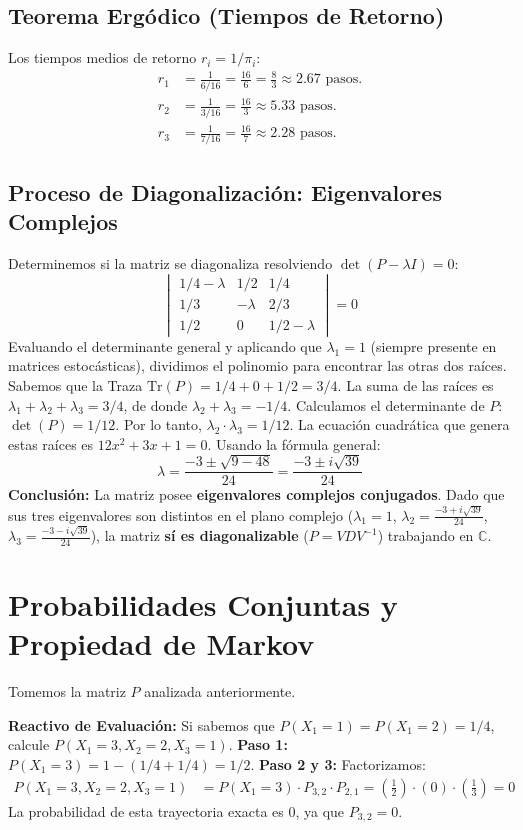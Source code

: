 \documentclass[12pt, a4paper]{article}
\begin{document}
\subsection{Teorema Ergódico (Tiempos de Retorno)}
Los tiempos medios de retorno $r_i = 1/\pi_i$:
\begin{align*}
    r_1 &= \frac{1}{6/16} = \frac{16}{6} = \frac{8}{3} \approx 2.67 \text{ pasos.} \\
    r_2 &= \frac{1}{3/16} = \frac{16}{3} \approx 5.33 \text{ pasos.} \\
    r_3 &= \frac{1}{7/16} = \frac{16}{7} \approx 2.28 \text{ pasos.}
\end{align*}

\subsection{Proceso de Diagonalización: Eigenvalores Complejos}
Determinemos si la matriz se diagonaliza resolviendo $\det(P - \lambda I) = 0$:
$$ \begin{vmatrix} 1/4-\lambda & 1/2 & 1/4 \\ 1/3 & -\lambda & 2/3 \\ 1/2 & 0 & 1/2-\lambda \end{vmatrix} = 0 $$
Evaluando el determinante general y aplicando que $\lambda_1 = 1$ (siempre presente en matrices estocásticas), dividimos el polinomio para encontrar las otras dos raíces.
Sabemos que la Traza $\text{Tr}(P) = 1/4 + 0 + 1/2 = 3/4$. La suma de las raíces es $\lambda_1 + \lambda_2 + \lambda_3 = 3/4$, de donde $\lambda_2 + \lambda_3 = -1/4$.
Calculamos el determinante de $P$: $\det(P) = 1/12$. Por lo tanto, $\lambda_2 \cdot \lambda_3 = 1/12$.
La ecuación cuadrática que genera estas raíces es $12x^2 + 3x + 1 = 0$.
Usando la fórmula general:
$$ \lambda = \frac{-3 \pm \sqrt{9 - 48}}{24} = \frac{-3 \pm i\sqrt{39}}{24} $$
\textbf{Conclusión:} La matriz posee \textbf{eigenvalores complejos conjugados}. Dado que sus tres eigenvalores son distintos en el plano complejo ($\lambda_1 = 1$, $\lambda_2 = \frac{-3 + i\sqrt{39}}{24}$, $\lambda_3 = \frac{-3 - i\sqrt{39}}{24}$), la matriz \textbf{sí es diagonalizable} ($P = VDV^{-1}$) trabajando en $\mathbb{C}$.

\section{Probabilidades Conjuntas y Propiedad de Markov}
Tomemos la matriz $P$ analizada anteriormente.

\textbf{Reactivo de Evaluación:} Si sabemos que $P(X_1 = 1) = P(X_1 = 2) = 1/4$, calcule $P(X_1 = 3, X_2 = 2, X_3 = 1)$.
\textbf{Paso 1:} $P(X_1 = 3) = 1 - (1/4 + 1/4) = 1/2$.
\textbf{Paso 2 y 3:} Factorizamos:
\begin{align*}
    P(X_1 = 3, X_2 = 2, X_3 = 1) &= P(X_1 = 3) \cdot P_{3,2} \cdot P_{2,1} = \left( \frac{1}{2} \right) \cdot (0) \cdot \left( \frac{1}{3} \right) = 0
\end{align*}
La probabilidad de esta trayectoria exacta es 0, ya que $P_{3,2} = 0$.
\end{document}
